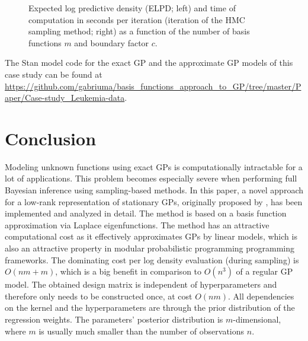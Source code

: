 \documentclass[onecolumn,a4paper,11pt]{article}
\begin{document}
\begin{figure}
\caption{Expected log predictive density (ELPD; left) and time of computation in seconds per iteration (iteration of the HMC sampling method; right) as a function of the number of basis functions $m$ and boundary factor $c$.}
  \label{ch5_fig22_elpd_leukemia}
\end{figure}

The Stan model code for the exact GP and the approximate GP models of this case study can be found at \url{https://github.com/gabriuma/basis_functions_approach_to_GP/tree/master/Paper/Case-study_Leukemia-data}.
%

\section{Conclusion}\label{ch5_sec_conclusion}
Modeling unknown functions using exact GPs is computationally intractable for a lot of applications. This problem becomes especially severe when performing full Bayesian inference using sampling-based methods. In this paper, a novel approach for a low-rank representation of stationary GPs, originally proposed by \cite{solin2018hilbert}, has been implemented and analyzed in detail. The method is based on a basis function approximation via Laplace eigenfunctions. The method has an attractive computational cost as it effectively approximates GPs by linear models, which is also an attractive property in modular probabilistic programming programming frameworks. 
The dominating cost per log density evaluation (during sampling) is $O(nm+m)$, which is a big benefit in comparison to $O(n^3)$ of a regular GP model. The obtained design matrix is independent of hyperparameters and therefore only needs to be constructed once, at cost $O(nm)$. All dependencies on the kernel and the hyperparameters are through the prior distribution of the regression weights. The parameters' posterior distribution is $m$-dimensional, where $m$ is usually much smaller than the number of observations $n$. 
\end{document}
